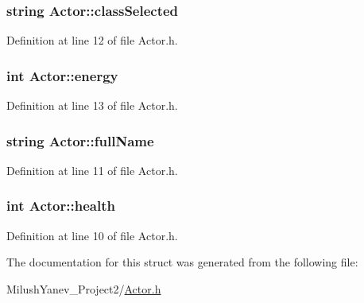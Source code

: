 \subsubsection[{class\+Selected}]{\setlength{\rightskip}{0pt plus 5cm}string Actor\+::class\+Selected}\label{struct_actor_a7950bfa41c5bb7a4ae04c925f800271e}


Definition at line 12 of file Actor.\+h.

\hypertarget{struct_actor_ab3bf461c752924b24b2b9a81250e5274}{}
\subsubsection[{energy}]{\setlength{\rightskip}{0pt plus 5cm}int Actor\+::energy}\label{struct_actor_ab3bf461c752924b24b2b9a81250e5274}


Definition at line 13 of file Actor.\+h.

\hypertarget{struct_actor_a2cadac890a05336b48e5b247901f5b08}{}
\subsubsection[{full\+Name}]{\setlength{\rightskip}{0pt plus 5cm}string Actor\+::full\+Name}\label{struct_actor_a2cadac890a05336b48e5b247901f5b08}


Definition at line 11 of file Actor.\+h.

\hypertarget{struct_actor_a6932c660e6b6293a66b393c3c9cb151a}{}
\subsubsection[{health}]{\setlength{\rightskip}{0pt plus 5cm}int Actor\+::health}\label{struct_actor_a6932c660e6b6293a66b393c3c9cb151a}


Definition at line 10 of file Actor.\+h.



The documentation for this struct was generated from the following file\+:\begin{DoxyCompactItemize}
\item 
Milush\+Yanev\+\_\+\+Project2/\hyperlink{_actor_8h}{Actor.\+h}\end{DoxyCompactItemize}
